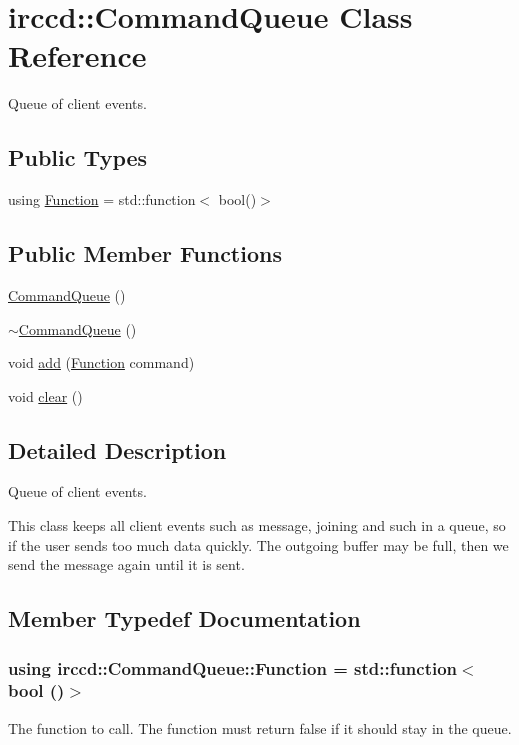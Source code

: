 \hypertarget{a00005}{\section{irccd\-:\-:Command\-Queue Class Reference}
\label{a00005}
}


Queue of client events.  


\subsection*{Public Types}
\begin{DoxyCompactItemize}
\item 
using \hyperlink{a00005_afff62165e70cada24c65cc822d77ddb4}{Function} = std\-::function$<$ bool()$>$
\end{DoxyCompactItemize}
\subsection*{Public Member Functions}
\begin{DoxyCompactItemize}
\item 
\hyperlink{a00005_a88944fe95d862bc300f8f3466c159675}{Command\-Queue} ()
\item 
\hyperlink{a00005_ab4abff4b16703bb48b444ec44094e60e}{$\sim$\-Command\-Queue} ()
\item 
void \hyperlink{a00005_afd9e47796a0ae7e9a107ab878f0a8846}{add} (\hyperlink{a00005_afff62165e70cada24c65cc822d77ddb4}{Function} command)
\item 
void \hyperlink{a00005_a621a78c347851b73d00c1679b24878ef}{clear} ()
\end{DoxyCompactItemize}


\subsection{Detailed Description}
Queue of client events. 

This class keeps all client events such as message, joining and such in a queue, so if the user sends too much data quickly. The outgoing buffer may be full, then we send the message again until it is sent. 

\subsection{Member Typedef Documentation}
\hypertarget{a00005_afff62165e70cada24c65cc822d77ddb4}{
\subsubsection[{Function}]{\setlength{\rightskip}{0pt plus 5cm}using {\bf irccd\-::\-Command\-Queue\-::\-Function} =  std\-::function$<$bool ()$>$}}\label{a00005_afff62165e70cada24c65cc822d77ddb4}
The function to call. The function must return false if it should stay in the queue. 

